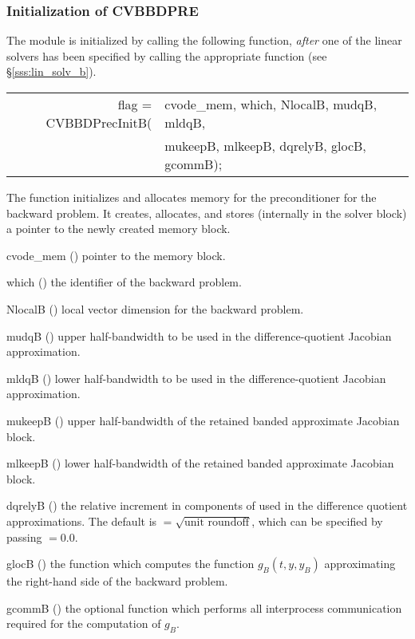 \subsubsection{Initialization of CVBBDPRE}
The {\cvbbdpre} module is initialized by calling the following function,
{\em after} one of the {\cvspils} linear solvers has been specified
by calling the appropriate function (see \S\ref{sss:lin_solv_b}).
{
  \begin{tabular}[t]{@{}r@{}l@{}}
    flag = CVBBDPrecInitB(&cvode\_mem, which, NlocalB, mudqB, mldqB,\\
                          &mukeepB, mlkeepB, dqrelyB, glocB, gcommB);
  \end{tabular}
}
{
  The function  initializes and allocates
  memory for the {\cvbbdpre} preconditioner for the backward problem.
  It creates, allocates, and stores (internally in the {\cvodes} solver
  block) a pointer to the newly created {\cvbbdpre} memory block.
}
{
  \begin{args}
  \item[cvode\_mem] ()
    pointer to the {\cvodes} memory block.
  \item[which] ()
    the identifier of the backward problem.
  \item[NlocalB] ()
    local vector dimension for the backward problem.
  \item[mudqB] ()
    upper half-bandwidth to be used in the difference-quotient Jacobian approximation.
  \item[mldqB] ()
    lower half-bandwidth to be used in the difference-quotient Jacobian approximation.
  \item[mukeepB] ()
    upper half-bandwidth of the retained banded approximate Jacobian block.
  \item[mlkeepB] ()
    lower half-bandwidth of the retained banded approximate Jacobian block.
  \item[dqrelyB] ()
    the relative increment in components of  used in the difference quotient
    approximations.  The default is $ = \sqrt{\text{unit roundoff}}$, which
    can be specified by passing $ = 0.0$.
  \item[glocB] ()
    the {\C} function which computes the function $g_B(t,y,y_B)$ approximating
    the right-hand side of the backward problem. 
  \item[gcommB] ()
    the optional {\C} function which performs all interprocess communication required for
    the computation of $g_B$.
  \end{args}
}

